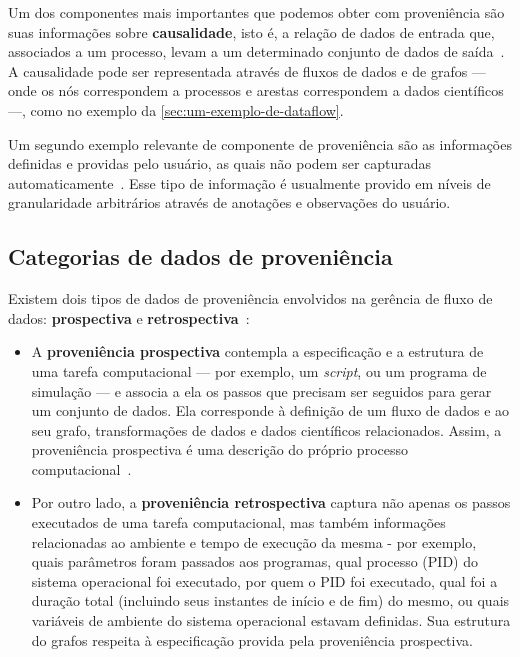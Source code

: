 Um dos componentes mais importantes que podemos obter com proveniência são suas informações sobre \textbf{causalidade}, isto é, a relação de dados de entrada que, associados a um processo, levam a um determinado conjunto de dados de saída~\cite{freire2008provenance}. A causalidade pode ser representada através de fluxos de dados e de grafos --- onde os nós correspondem a processos e arestas correspondem a dados científicos ---, como no exemplo da \autoref{sec:um-exemplo-de-dataflow}.

Um segundo exemplo relevante de componente de proveniência são as informações definidas e providas pelo usuário, as quais não podem ser capturadas automaticamente~\cite{freire2008provenance}. Esse tipo de informação é usualmente provido em níveis de granularidade arbitrários através de anotações e observações do usuário.

\subsection{Categorias de dados de proveniência}

Existem dois tipos de dados de proveniência envolvidos na gerência de fluxo de dados: \textbf{prospectiva} e \textbf{retrospectiva}~\cite{murta2014noworkflow,freire2008provenance}:

\begin{itemize}
    \item A \textbf{proveniência prospectiva} contempla a especificação e a estrutura de uma tarefa computacional --- por exemplo, um \textit{script}, ou um programa de simulação --- e associa a ela os passos que precisam ser seguidos para gerar um conjunto de dados. Ela corresponde à definição de um fluxo de dados e ao seu grafo, transformações de dados e dados científicos relacionados. Assim, a proveniência prospectiva é uma descrição do próprio processo computacional~\cite{mcphillips2015yesworkflow}.
    \item Por outro lado, a \textbf{proveniência retrospectiva} captura não apenas os passos executados de uma tarefa computacional, mas também informações relacionadas ao ambiente e tempo de execução da mesma - por exemplo, quais parâmetros foram passados aos programas, qual  processo (PID) do sistema operacional foi executado, por quem o PID foi executado, qual foi a duração total (incluindo seus instantes de início e de fim) do mesmo, ou quais variáveis de ambiente do sistema operacional estavam definidas. Sua estrutura do grafos respeita à especificação provida pela proveniência prospectiva.
\end{itemize}

